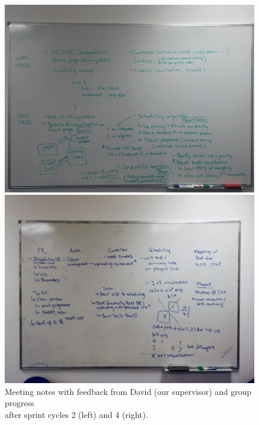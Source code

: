 \documentclass[a4paper]{article}
\begin{document}
\begin{figure}[H]
  \begin{minipage}{0.49\textwidth}
    \includegraphics[width = \textwidth, trim = 0 0.4cm 0 1.6cm, clip]{./evaluation/meeting-board2.jpg}
  \end{minipage}
  \begin{minipage}{0.49\textwidth}
    \includegraphics[width = \textwidth, trim = 1.2cm 1.5cm 1.2cm 2.5cm, clip]{./evaluation/meeting-board.jpg}
  \end{minipage}
  \caption{Meeting notes with feedback from David (our supervisor) and group progress \\
                    after sprint cycles 2 (left) and 4 (right).}
  \label{fig:meetingboard}
\end{figure}
\end{document}

